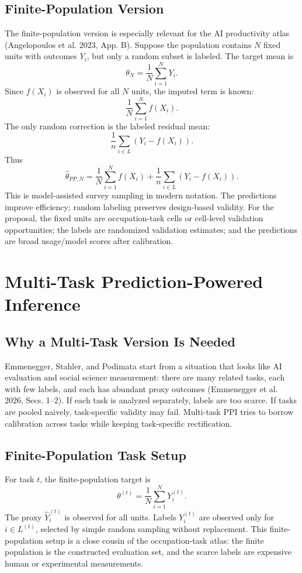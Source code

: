 \documentclass[11pt]{article}
\begin{document}
\subsection{Finite-Population Version}

The finite-population version is especially relevant for the AI productivity atlas (Angelopoulos et al. 2023, App. B). Suppose the population contains $N$ fixed units with outcomes $Y_i$, but only a random subset is labeled. The target mean is
\[
  \theta_N=\frac{1}{N}\sum_{i=1}^N Y_i.
\]
Since $f(X_i)$ is observed for all $N$ units, the imputed term is known:
\[
  \frac{1}{N}\sum_{i=1}^N f(X_i).
\]
The only random correction is the labeled residual mean:
\[
  \frac{1}{n}\sum_{i\in L}(Y_i-f(X_i)).
\]
Thus
\[
  \widehat\theta_{PP,N}
  =
  \frac{1}{N}\sum_{i=1}^N f(X_i)
  +
  \frac{1}{n}\sum_{i\in L}(Y_i-f(X_i)).
\]
This is model-assisted survey sampling in modern notation. The predictions improve efficiency; random labeling preserves design-based validity. For the proposal, the fixed units are occupation-task cells or cell-level validation opportunities; the labels are randomized validation estimates; and the predictions are broad usage/model scores after calibration.

\section{Multi-Task Prediction-Powered Inference}

\subsection{Why a Multi-Task Version Is Needed}

Emmenegger, Stahler, and Podimata start from a situation that looks like AI evaluation and social science measurement: there are many related tasks, each with few labels, and each has abundant proxy outcomes (Emmenegger et al. 2026, Secs. 1--2). If each task is analyzed separately, labels are too scarce. If tasks are pooled naively, task-specific validity may fail. Multi-task PPI tries to borrow calibration across tasks while keeping task-specific rectification.

\subsection{Finite-Population Task Setup}

For task $t$, the finite-population target is
\[
  \theta^{(t)}
  =
  \frac{1}{N}\sum_{i=1}^N Y_i^{(t)}.
\]
The proxy $\widehat Y_i^{(t)}$ is observed for all units. Labels $Y_i^{(t)}$ are observed only for $i\in L^{(t)}$, selected by simple random sampling without replacement. This finite-population setup is a close cousin of the occupation-task atlas: the finite population is the constructed evaluation set, and the scarce labels are expensive human or experimental measurements.
\end{document}
